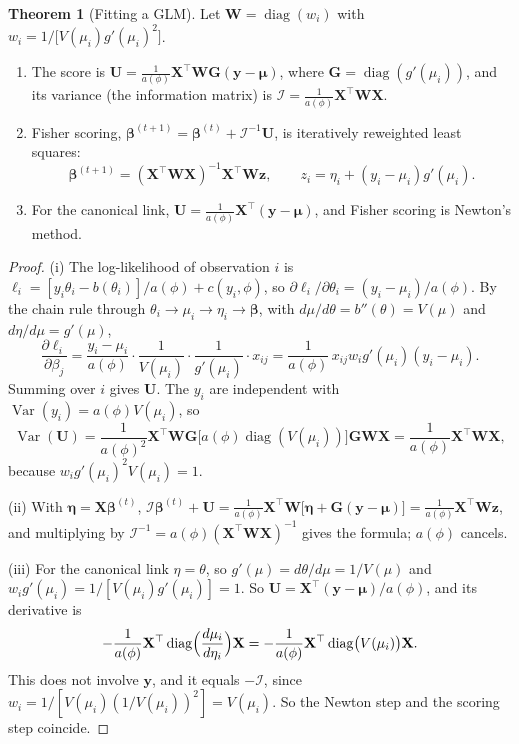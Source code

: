 \documentclass[11pt,a4paper]{article}
\numberwithin{equation}{section}
\theoremstyle{definition}
\newtheorem{thm}{Theorem}[subsection]
\begin{document}
\begin{thm}[Fitting a GLM]\label{thm:irls}
Let $\mathbf{W} = \operatorname{diag}(w_i)$ with $w_i = 1/\bigl[V(\mu_i)g'(\mu_i)^2\bigr]$.
\begin{enumerate}[label=(\roman*)]
\item The score is $\mathbf{U} = \frac{1}{a(\phi)}\mathbf{X}^\top\mathbf{W}\mathbf{G}(\mathbf{y} - \boldsymbol\mu)$, where $\mathbf{G} = \operatorname{diag}(g'(\mu_i))$, and its variance (the
information matrix) is $\mathcal{I} = \frac{1}{a(\phi)}\mathbf{X}^\top\mathbf{WX}$.
\item Fisher scoring, $\boldsymbol\beta^{(t+1)} = \boldsymbol\beta^{(t)} + \mathcal{I}^{-1}\mathbf{U}$, is iteratively reweighted least squares:
\[
\boldsymbol\beta^{(t+1)} = (\mathbf{X}^\top\mathbf{WX})^{-1}\mathbf{X}^\top\mathbf{Wz}, \qquad z_i = \eta_i + (y_i - \mu_i)g'(\mu_i) .
\]
\item For the canonical link, $\mathbf{U} = \frac{1}{a(\phi)}\mathbf{X}^\top(\mathbf{y} - \boldsymbol\mu)$, and Fisher scoring is Newton's method.
\end{enumerate}
\end{thm}

\begin{proof}
(i) The log-likelihood of observation $i$ is $\ell_i = [y_i\theta_i - b(\theta_i)]/a(\phi) + c(y_i, \phi)$, so
$\partial\ell_i/\partial\theta_i = (y_i - \mu_i)/a(\phi)$. By the chain rule through $\theta_i \to \mu_i \to \eta_i \to \boldsymbol\beta$, with
$d\mu/d\theta = b''(\theta) = V(\mu)$ and $d\eta/d\mu = g'(\mu)$,
\[
\frac{\partial\ell_i}{\partial\beta_j} = \frac{y_i - \mu_i}{a(\phi)}\cdot\frac{1}{V(\mu_i)}\cdot\frac{1}{g'(\mu_i)}\cdot x_{ij}
= \frac{1}{a(\phi)}\,x_{ij}w_ig'(\mu_i)(y_i - \mu_i) .
\]
Summing over $i$ gives $\mathbf{U}$. The $y_i$ are independent with $\operatorname{Var}(y_i) = a(\phi)V(\mu_i)$, so
\[
\operatorname{Var}(\mathbf{U}) = \frac{1}{a(\phi)^2}\mathbf{X}^\top\mathbf{WG}\bigl[a(\phi)\operatorname{diag}(V(\mu_i))\bigr]\mathbf{GWX} = \frac{1}{a(\phi)}\mathbf{X}^\top\mathbf{WX} ,
\]
because $w_ig'(\mu_i)^2V(\mu_i) = 1$.

(ii) With $\boldsymbol\eta = \mathbf{X}\boldsymbol\beta^{(t)}$, $\mathcal{I}\boldsymbol\beta^{(t)} + \mathbf{U} = \frac{1}{a(\phi)}\mathbf{X}^\top\mathbf{W}\bigl[\boldsymbol\eta + \mathbf{G}(\mathbf{y} - \boldsymbol\mu)\bigr] = \frac{1}{a(\phi)}\mathbf{X}^\top\mathbf{Wz}$, and
multiplying by $\mathcal{I}^{-1} = a(\phi)(\mathbf{X}^\top\mathbf{WX})^{-1}$ gives the formula; $a(\phi)$ cancels.

(iii) For the canonical link $\eta = \theta$, so $g'(\mu) = d\theta/d\mu = 1/V(\mu)$ and $w_ig'(\mu_i) = 1/[V(\mu_i)g'(\mu_i)] = 1$. So $\mathbf{U} = \mathbf{X}^\top(\mathbf{y} - \boldsymbol\mu)/a(\phi)$, and its derivative is
\[
-\frac{1}{a(\phi)}\mathbf{X}^\top\operatorname{diag}\Bigl(\frac{d\mu_i}{d\eta_i}\Bigr)\mathbf{X} = -\frac{1}{a(\phi)}\mathbf{X}^\top\operatorname{diag}\bigl(V(\mu_i)\bigr)\mathbf{X} .
\]
This does not involve $\mathbf{y}$, and it equals $-\mathcal{I}$, since $w_i = 1/[V(\mu_i)(1/V(\mu_i))^2] = V(\mu_i)$. So the Newton step and the scoring step coincide.
\end{proof}
\end{document}
